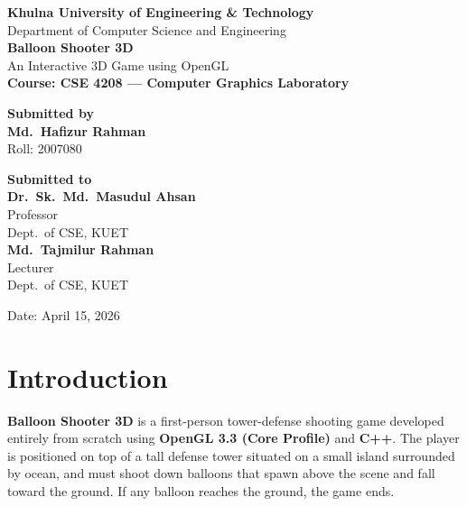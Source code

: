 \documentclass[12pt,a4paper]{article}
\begin{document}
\begin{titlepage}
    \centering
    \vspace*{1cm}

    {\LARGE \textbf{Khulna University of Engineering \& Technology}}\\[0.3cm]
    {\large Department of Computer Science and Engineering}\\[2cm]

    {\Huge \textbf{Balloon Shooter 3D}}\\[0.5cm]
    {\Large An Interactive 3D Game using OpenGL}\\[1.5cm]

    {\large \textbf{Course: CSE 4208 --- Computer Graphics Laboratory}}\\[2cm]

    \begin{minipage}[t]{0.45\textwidth}
        \raggedright
        \textbf{Submitted by}\\[0.2cm]
        \textbf{Md.\ Hafizur Rahman}\\
        Roll: 2007080
    \end{minipage}
    \hfill
    \begin{minipage}[t]{0.45\textwidth}
        \raggedleft
        \textbf{Submitted to}\\[0.2cm]
        \textbf{Dr.\ Sk.\ Md.\ Masudul Ahsan}\\
        Professor\\
        Dept.\ of CSE, KUET\\[0.4cm]
        \textbf{Md.\ Tajmilur Rahman}\\
        Lecturer\\
        Dept.\ of CSE, KUET
    \end{minipage}

    \vfill
    {\large Date: April 15, 2026}
\end{titlepage}

\tableofcontents
\newpage

\section{Introduction}

\textbf{Balloon Shooter 3D} is a first-person tower-defense shooting game developed entirely from scratch using \textbf{OpenGL 3.3 (Core Profile)} and \textbf{C++}. The player is positioned on top of a tall defense tower situated on a small island surrounded by ocean, and must shoot down balloons that spawn above the scene and fall toward the ground. If any balloon reaches the ground, the game ends.
\end{document}
